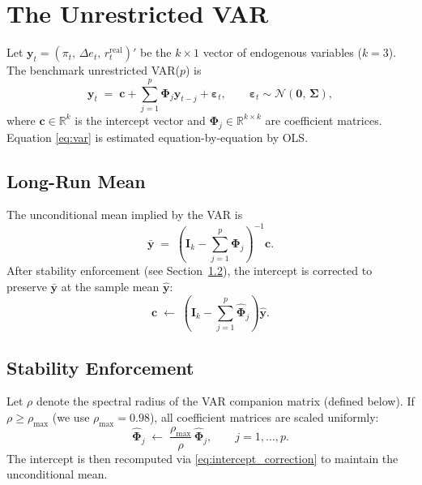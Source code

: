 \documentclass[12pt, a4paper]{article}
\newcommand{\bs}[1]{\boldsymbol{#1}}
\newcommand{\eye}{\mathbf{I}}
\begin{document}
\section{The Unrestricted VAR}

Let $\bs{y}_t = (\pi_t,\, \Delta e_t,\, r_t^{\mathrm{real}})'$ be the
$k\times 1$ vector of endogenous variables ($k=3$). The benchmark
unrestricted VAR($p$) is
\begin{equation}
    \bs{y}_t \;=\; \bs{c} + \sum_{j=1}^{p} \bs{\Phi}_j \bs{y}_{t-j} + \bs{\varepsilon}_t,
    \qquad \bs{\varepsilon}_t \sim \mathcal{N}(\bs{0},\,\bs{\Sigma}),
    \label{eq:var}
\end{equation}
where $\bs{c}\in\mathbb{R}^k$ is the intercept vector and
$\bs{\Phi}_j\in\mathbb{R}^{k\times k}$ are coefficient matrices. Equation
\eqref{eq:var} is estimated equation-by-equation by OLS.

\subsection{Long-Run Mean}

The unconditional mean implied by the VAR is
\begin{equation}
    \bar{\bs{y}} \;=\; \left(\eye_k - \sum_{j=1}^{p}\bs{\Phi}_j\right)^{-1}\bs{c}.
    \label{eq:lr_mean}
\end{equation}
After stability enforcement (see Section~\ref{sec:stability}), the intercept
is corrected to preserve $\bar{\bs{y}}$ at the sample mean $\widehat{\bs{y}}$:
\begin{equation}
    \bs{c} \;\leftarrow\; \left(\eye_k - \sum_{j=1}^{p}\hat{\bs{\Phi}}_j\right)\widehat{\bs{y}}.
    \label{eq:intercept_correction}
\end{equation}

\subsection{Stability Enforcement}
\label{sec:stability}

Let $\rho$ denote the spectral radius of the VAR companion matrix (defined
below). If $\rho \geq \rho_{\max}$ (we use $\rho_{\max}=0.98$), all coefficient
matrices are scaled uniformly:
\begin{equation}
    \hat{\bs{\Phi}}_j \;\leftarrow\; \frac{\rho_{\max}}{\rho}\,\hat{\bs{\Phi}}_j,
    \qquad j=1,\ldots,p.
\end{equation}
The intercept is then recomputed via \eqref{eq:intercept_correction} to
maintain the unconditional mean.
\end{document}
